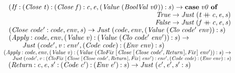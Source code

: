 \documentclass[10pt]{article}
\newcommand{\Conid}[1]{\mathit{#1}}
\newcommand{\Varid}[1]{\mathit{#1}}
\newcommand{\plus}{\mathbin{+\!\!\!+}}
\begin{document}
\begin{hscode}
${\hskip4.00em\relax(\Conid{If}\mathbin{:}(\Conid{Close}\;\Varid{t})\mathbin{:}(\Conid{Close}\;\Varid{f})\mathbin{:}\Varid{c},\Varid{e},(\Conid{Value}\;(\Conid{BoolVal}\;\Varid{v0}))\mathbin{:}\Varid{s})\to \mathbf{case}\;\Varid{v0}\;\mathbf{of}}$\\
${\hskip4.00em\relax\phantom{(\Conid{If}\mathbin{:}(\Conid{Close}\;\Varid{t})\mathbin{:}(\Conid{Close}\;\Varid{f})\mathbin{:}\Varid{c},\Varid{e},(\Conid{Value}\;(\Conid{BoolVal}\;\Varid{v0}\mbox{}}\Conid{True}\to \Conid{Just}\;(\Varid{t}\plus \Varid{c},\Varid{e},\Varid{s})}$\\
${\hskip4.00em\relax\phantom{(\Conid{If}\mathbin{:}(\Conid{Close}\;\Varid{t})\mathbin{:}(\Conid{Close}\;\Varid{f})\mathbin{:}\Varid{c},\Varid{e},(\Conid{Value}\;(\Conid{BoolVal}\;\Varid{v0}\mbox{}}\Conid{False}\to \Conid{Just}\;(\Varid{f}\plus \Varid{c},\Varid{e},\Varid{s})}$\\
${\hskip4.00em\relax(\Conid{Close}\;\Varid{code'}\mathbin{:}\Varid{code},\Varid{env},\Varid{s})\to \Conid{Just}\;(\Varid{code},\Varid{env},(\Conid{Value}\;(\Conid{Clo}\;\Varid{code'}\;\Varid{env}))\mathbin{:}\Varid{s})}$\\
${\hskip4.00em\relax(\Conid{Apply}\mathbin{:}\Varid{code},\Varid{env},(\Conid{Value}\;\Varid{v})\mathbin{:}(\Conid{Value}\;(\Conid{Clo}\;\Varid{code'}\;\Varid{env'}))\mathbin{:}\Varid{s})\to }$\\
${\hskip4.00em\relax\hskip2.00em\relax\Conid{Just}\;(\Varid{code'},\Varid{v}\mathbin{:}\Varid{env'},(\Conid{Code}\;\Varid{code})\mathbin{:}(\Conid{Env}\;\Varid{env})\mathbin{:}\Varid{s})}$\\
${\hskip4.00em\relax(\Conid{Apply}\mathbin{:}\Varid{code},\Varid{env},(\Conid{Value}\;\Varid{v})\mathbin{:}(\Conid{Value}\;(\Conid{CloFix}\;[\mskip1.5mu \Conid{Close}\;[\mskip1.5mu \Conid{Close}\;\Varid{code'},\Conid{Return}\mskip1.5mu],\Conid{Fix}\mskip1.5mu]\;\Varid{env'}))\mathbin{:}\Varid{s})\to }$\\
${\hskip4.00em\relax\hskip2.00em\relax\Conid{Just}\;(\Varid{code'},\Varid{v}\mathbin{:}(\Conid{CloFix}\;[\mskip1.5mu \Conid{Close}\;[\mskip1.5mu \Conid{Close}\;\Varid{code'},\Conid{Return}\mskip1.5mu],\Conid{Fix}\mskip1.5mu]\;\Varid{env'})\mathbin{:}\Varid{env'},(\Conid{Code}\;\Varid{code})\mathbin{:}(\Conid{Env}\;\Varid{env})\mathbin{:}\Varid{s})}$\\
${\hskip4.00em\relax(\Conid{Return}\mathbin{:}\Varid{c},\Varid{e},\Varid{s'}\mathbin{:}(\Conid{Code}\;\Varid{c'})\mathbin{:}(\Conid{Env}\;\Varid{e'})\mathbin{:}\Varid{s})\to \Conid{Just}\;(\Varid{c'},\Varid{e'},\Varid{s'}\mathbin{:}\Varid{s})}$\\

\end{hscode}
\end{document}

